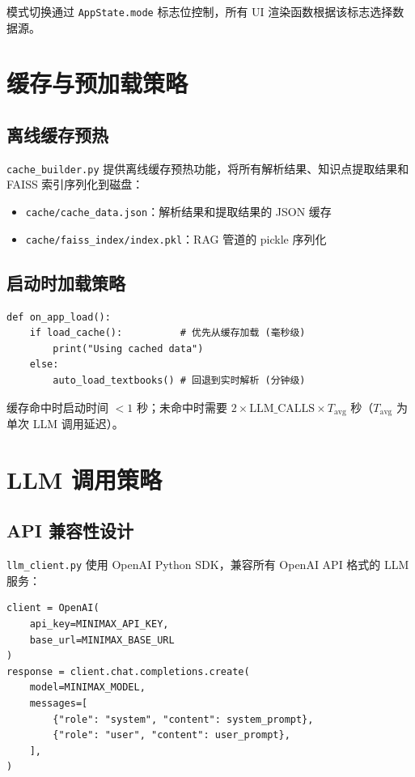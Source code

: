 \documentclass[12pt,a4paper]{article}
\begin{document}
模式切换通过 \texttt{AppState.mode} 标志位控制，所有 UI 渲染函数根据该标志选择数据源。

\section{缓存与预加载策略}
\label{sec:caching}

\subsection{离线缓存预热}

\texttt{cache\_builder.py} 提供离线缓存预热功能，将所有解析结果、知识点提取结果和 FAISS 索引序列化到磁盘：

\begin{itemize}[leftmargin=2em]
    \item \texttt{cache/cache\_data.json}：解析结果和提取结果的 JSON 缓存
    \item \texttt{cache/faiss\_index/index.pkl}：RAG 管道的 pickle 序列化
\end{itemize}

\subsection{启动时加载策略}

\begin{lstlisting}[title={启动加载逻辑}]
def on_app_load():
    if load_cache():          # 优先从缓存加载 (毫秒级)
        print("Using cached data")
    else:
        auto_load_textbooks() # 回退到实时解析 (分钟级)
\end{lstlisting}

缓存命中时启动时间 $< 1$ 秒；未命中时需要 $2 \times \text{LLM\_CALLS} \times T_{\text{avg}}$ 秒（$T_{\text{avg}}$ 为单次 LLM 调用延迟）。

\section{LLM 调用策略}
\label{sec:llm-strategy}

\subsection{API 兼容性设计}

\texttt{llm\_client.py} 使用 OpenAI Python SDK，兼容所有 OpenAI API 格式的 LLM 服务：

\begin{lstlisting}[title={LLM 客户端核心代码}]
client = OpenAI(
    api_key=MINIMAX_API_KEY,
    base_url=MINIMAX_BASE_URL
)
response = client.chat.completions.create(
    model=MINIMAX_MODEL,
    messages=[
        {"role": "system", "content": system_prompt},
        {"role": "user", "content": user_prompt},
    ],
)
\end{lstlisting}
\end{document}
